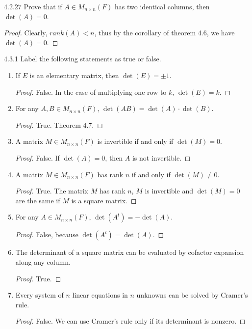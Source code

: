 \documentclass[12pt, a4paper]{article}
\theoremstyle{plain}
\begin{document}
\begin{exercise}{4.2.27}
Prove that if $A\in M_{n\times n}(F)$ has two identical columns, then $\det(A)=0$.
\end{exercise}
	\begin{proof}
	Clearly, $rank(A)<n$, thus by the corollary of theorem 4.6, we have $\det (A)=0$.
	\end{proof}

\pagebreak
	
\begin{exercise}{4.3.1}
Label the following statements as true or false.
	\begin{enumerate}[label=(\roman*)]
	\item If $E$ is an elementary matrix, then $\det(E)=\pm 1$.
	\begin{proof}
	False. In the case of multiplying one row to $k$, $\det(E)=k$.
	\end{proof}
	\item For any $A,B\in M_{n\times n}(F)$, $\det(AB)=\det(A)\cdot \det(B)$.
	\begin{proof}
	True. Theorem 4.7.
	\end{proof}
	\item A matrix $M\in M_{n\times n}(F)$ is invertible if and only if $\det(M)=0$.
	\begin{proof}
	False. If $\det(A)=0$, then $A$ is not invertible.
	\end{proof}
	\item A matrix $M\in M_{n\times n}(F)$ has rank $n$ if and only if $\det(M)\neq 0$.
	\begin{proof}
	True. The matrix $M$ has rank $n$, $M$ is invertible and $\det(M)=0$ are the same if $M$ is a square matrix.
	\end{proof}
	\item For any $A\in M_{n\times n}(F)$, $\det(A^t)=-\det(A)$.
	\begin{proof}
	False, because $\det(A^t)=\det(A)$.
	\end{proof}
	\item The determinant of a square matrix can be evaluated by cofactor expansion along any column.
	\begin{proof}
	True.
	\end{proof}
	\item Every system of $n$ linear equations in $n$ unknowns can be solved by Cramer's rule.
	\begin{proof}
	False. We can use Cramer's rule only if its determinant is nonzero.
	\end{proof}

\end{enumerate}
\end{exercise}
\end{document}
